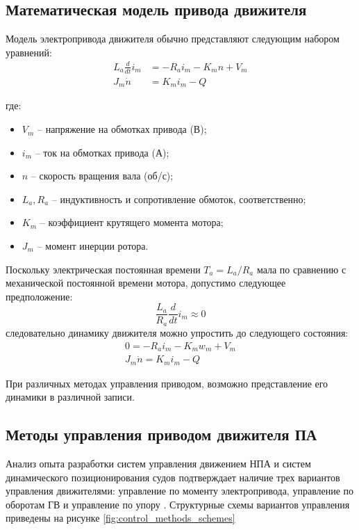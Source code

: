 \subsection{Математическая модель привода движителя}

Модель электропривода движителя обычно представляют следующим набором уравнений:
\begin{equation}
	\label{eq:motor_model}
	\begin{array}{ll}
	L_a\frac{d}{dt}i_m &=-R_ai_m-K_m n + V_m \\
    J_m\dot{n} &= K_m i_m - Q
	\end{array}
\end{equation}

\noindent где:
\begin{itemize}
    \item $V_m$ -- напряжение на обмотках привода (В);
    \item $i_m$ -- ток на обмотках привода (А);
    \item $n$ -- скорость вращения вала (об/с);
    \item $L_a, R_a$ -- индуктивность и сопротивление обмоток, соответственно;
    \item $K_m$ -- коэффициент крутящего момента мотора;
    \item $J_m$ -- момент инерции ротора.
\end{itemize}

Поскольку электрическая постоянная времени $T_a=L_a/R_a$ мала по сравнению с механической постоянной времени мотора, допустимо следующее предположение:
\begin{equation}
    \frac{L_a}{R_a}\frac{d}{dt}i_m \approx 0
\end{equation}
\noindent следовательно динамику движителя можно упростить до следующего состояния:
\begin{gather}
    \label{eq:motor_dynamics}
    0 = -R_a i_m-K_m w_m + V_m \\
    J_m\dot{n} = K_m i_m - Q
\end{gather}

При различных методах управления приводом, возможно представление его динамики в различной записи.

\subsection{Методы управления приводом движителя ПА}
Анализ опыта разработки систем управления движением НПА и систем динамического позиционирования судов подтверждает наличие трех вариантов управления движителями: управление по моменту электропривода, управление по оборотам ГВ и управление по упору \cite{костенко2020исследование, sorensen20003}.
Структурные схемы вариантов управления приведены на рисунке \ref{fig:control_methods_schemes}

